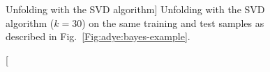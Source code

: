 \documentclass{cernrep}
\begin{document}
\begin{figure}
%
\caption
[Unfolding with the SVD algorithm]%
{Unfolding with the SVD algorithm ($k=30$) on the same training and test
samples as described in Fig.~\ref{Fig:adye:bayes-example}.}%
\label{Fig:adye:svd-example}%
\end{figure}%
\end{document}
